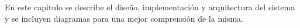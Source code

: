 


En este capítulo se describe el diseño, implementación y arquitectura del sistema y se incluyen diagramas para una
mejor comprensión de la misma.




